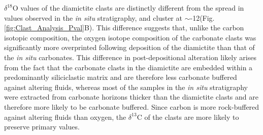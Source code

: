 \documentclass[11pt,letterpaper]{article}
\newcommand{\dC}{$\delta^{13}$C\xspace}
\newcommand{\dO}{$\delta^{18}$O\xspace}
\newcommand{\permil}{\textperthousand\xspace}
\begin{document}
\dO values of the diamictite clasts are distinctly different from the spread in values observed in the \textit{in situ} stratigraphy, and cluster at $\sim$-12\permil (Fig. \ref{fig:Clast_Analysis_Pval}B). This difference suggests that, unlike the carbon isotopic composition, the oxygen isotope composition of the carbonate clasts was significantly more overprinted following deposition of the diamictite than that of the \textit{in situ} carbonates. This difference in post-depositional alteration likely arises from the fact that the carbonate clasts in the diamictite are embedded within a predominantly siliciclastic matrix and are therefore less carbonate buffered against altering fluids, whereas most of the samples in the \textit{in situ} stratigraphy were extracted from carbonate horizons thicker than the diamictite clasts and are therefore more likely to be carbonate buffered. Since carbon is more rock-buffered against altering fluids than oxygen, the \dC of the clasts are more likely to preserve primary values.
\end{document}
